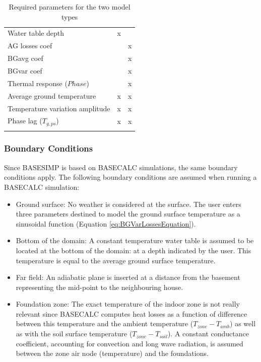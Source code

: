 \begin{longtable}{lcc}
Water table depth               & x                                 &                           \\
AG losses coef                  &                                   & x                         \\
BGavg coef                      &                                   & x                         \\
BGvar coef                      &                                   & x                         \\
Thermal response ($Phase$)      &                                   & x                         \\
Average ground temperature      & x                                 & x                         \\
Temperature variation amplitude & x                                 & x                         \\
Phase lag ($T_{g,ps}$)          & x                                 & x                         \\
\hline
\caption{Required parameters for the two model types} \label{table:BSFoundationParameters}
\end{longtable}


\subsubsection{Boundary Conditions}\label{boundary-conditions-basesimp}

Since BASESIMP is based on BASECALC simulations, the same boundary conditions apply.  The following boundary conditions are assumed when running a BASECALC simulation:
\begin{itemize}
    \item Ground surface: No weather is considered at the surface.  The user enters three parameters destined to model the ground surface temperature as a sinusoidal function (Equation \ref{eq:BGVarLossesEquation}).
    \item Bottom of the domain: A constant temperature water table is assumed to be located at the bottom of the domain: at a depth indicated by the user. This temperature is equal to the average ground surface temperature.
    \item Far field: An adiabatic plane is inserted at a distance from the basement representing the mid-point to the neighbouring house.
    \item Foundation zone:  The exact temperature of the indoor zone is not really relevant since BASECALC computes heat losses as a function of difference between this temperature and the ambient temperature ($T_{zone}-T_{amb}$) as well as with the soil surface temperature ($T_{zone}-T_{soil}$).  A constant conductance coefficient, accounting for convection and long wave radiation, is assumed between the zone air node (temperature) and the foundations.
\end{itemize}


